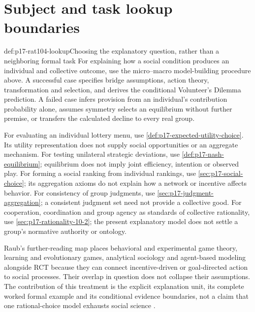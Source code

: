\section{Subject and task lookup boundaries}
\label{sec:p17-rat104-lookup}

\begin{hbmethod}{def:p17-rat104-lookup}{Choosing the explanatory question, rather than a neighboring formal task}
For explaining how a social condition produces an individual and collective
outcome, use the micro--macro model-building procedure above. A successful
case specifies bridge assumptions, action theory, transformation and
selection, and derives the conditional Volunteer's Dilemma prediction.
A failed case infers provision from an individual's contribution probability
alone, assumes symmetry selects an equilibrium without further premise,
or transfers the calculated decline to every real group.

For evaluating an individual lottery menu, use
\cref{def:p17-expected-utility-choice}. Its utility representation does not
supply social opportunities or an aggregate mechanism. For testing unilateral
strategic deviations, use \cref{def:p17-nash-equilibrium}; equilibrium
does not imply joint efficiency, intention or observed play. For forming a
social ranking from individual rankings, use
\cref{sec:p17-social-choice}; its aggregation axioms do not explain how a
network or incentive affects behavior. For consistency of group judgments,
use \cref{sec:p17-judgment-aggregation}; a consistent judgment set need
not provide a collective good. For cooperation, coordination and group
agency as standards of collective rationality, use
\cref{sec:p17-rationality-10-2}; the present explanatory model does not
settle a group's normative authority or ontology.
\end{hbmethod}

Raub's further-reading map places behavioral and experimental game theory,
learning and evolutionary games, analytical sociology and agent-based
modeling alongside RCT because they can connect incentive-driven or
goal-directed action to social processes. Their overlap in question does
not collapse their assumptions. The contribution of this treatment is the
explicit explanation unit, its complete worked formal example and its
conditional evidence boundaries, not a claim that one rational-choice
model exhausts social science
\parencite[p.~620]{Raub2021RationalChoiceSocialSciences}.
